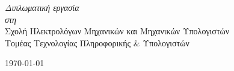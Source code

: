 \documentclass[
11pt, %
english, %
singlespacing, %
parskip, %
headsepline, %
]{MastersDoctoralThesis} %
\begin{document}
\begin{titlepage}
\begin{center}
\large \textit{Διπλωματική εργασία}\\[0.3cm] %
\textit{στη}\\[0.4cm]
  Σχολή Ηλεκτρολόγων Μηχανικών και Μηχανικών Υπολογιστών \\ Τομέας Τεχνολογίας Πληροφορικής \& Υπολογιστών\\[2cm] %

\vfill

{\large \today}\\[4cm] %

\vfill
\end{center}
\end{titlepage}


%
%
%
%
\end{document}
